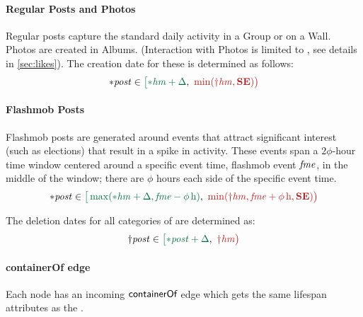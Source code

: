 \paragraph{Regular Posts and Photos}

Regular posts capture the standard daily activity in a Group or on a Wall.
Photos are created in Albums. (Interaction with Photos is limited to \tLikes, see details in \autoref{sec:likes}). The creation date for these is determined as follows:
$$\varc{\ePost} \in \interval{\varc{\eHasMember} + \Delta}{\min (\vard{\eHasMember}, \xSE) }$$

\paragraph{Flashmob Posts}

Flashmob posts are generated around events that attract significant interest
(such as elections) that result in a spike in activity.
These events span a $2\phi$-hour time window centered around a specific event time, %
flashmob event $\mathit{fme}$, in the middle of the window; there are $\phi$ hours each side of the specific event time.
$$
\varc{\ePost} \in \interval{\max(\varc{\eHasMember} + \Delta,\eFlashmobEvent - \phi\textrm{\,h})}{\min (\vard{\eHasMember},\eFlashmobEvent + \phi\textrm{\,h},\xSE)}
$$

The deletion dates for all categories of \tPosts are determined as:
$$\vard{\ePost} \in \interval{\varc{\ePost} + \Delta}{\vard{\eHasMember}}$$


\paragraph{containerOf edge}

Each \tPost node has an incoming $\textsf{containerOf}$ edge which gets the same lifespan attributes as the \tPost.

